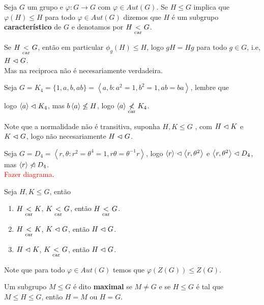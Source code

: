 \begin{definition}
  Seja $G$ um grupo e $\varphi:G\to G$ com $\varphi\in Aut(G)$. Se $H\leq G$ implica que $\varphi(H)\leq H$ para todo $\varphi\in Aut(G)$ dizemos que $H$ é um subgrupo \textbf{característico} de $G$ e denotamos por $H\underset{\text{car}}{<} G$. 
\end{definition}
\begin{note}
  Se $H\underset{\text{car}}{<} G$, então em particular $\phi_g(H)\leq H$, logo $gH=Hg$ para todo $g\in G$, i.e, $H\vartriangleleft G$.\\
  Mas na reciproca não é necesariamente verdadeira.
\end{note}
\begin{example}
  Seja $G=K_4=\{1,a,b,ab\}=\left\langle a,b:a^{2}=1,b^{2}=1,ab=ba \right\rangle$, lembre que
  \begin{center}
    
  \end{center}
  logo $\left\langle a \right\rangle\vartriangleleft K_4$, mas $b\left\langle a \right\rangle\cnot\leq H$, logo $\left\langle a \right\rangle \cnot\car K_4$.
\end{example}
Note que a normalidade não é transitiva, suponha $H,K\leq G$ , com $H\vartriangleleft K$ e $K\vartriangleleft G$, logo não necesariamente $H\vartriangleleft G$.
\begin{example}
  Seja $G=D_4=\left\langle r,\theta:r^{2}=\theta^{4}=1,r\theta=\theta^{-1}r \right\rangle$, logo $\left\langle r \right\rangle\vartriangleleft \left\langle r,\theta^{2} \right\rangle$ e $\left\langle r,\theta^{2} \right\rangle\vartriangleleft D_4$, mas $\left\langle r \right\rangle\cnot\normal D_4$.\\
  \textcolor{red}{Fazer diagrama}.
\end{example}
\begin{proposition}
  Seja $H,K\leq G$, então
  \begin{enumerate}
    \item $H\underset{\text{car}}{<} K$, $K\underset{\text{car}}{<} G$, então $H\underset{\text{car}}{<} G$.
    \item $H\underset{\text{car}}{<} K$, $K\vartriangleleft G$, então $H\vartriangleleft G$.
    \item $H\vartriangleleft K$, $K\underset{\text{car}}{<} G$, então $H\vartriangleleft G$.
  \end{enumerate}
\end{proposition}
\begin{example}
  Note que para todo $\varphi\in Aut(G)$ temos que $\varphi(Z(G))\leq Z(G)$.
\end{example}
\begin{definition}
  Um subgrupo $M\leq G$ é dito \textbf{maximal} se $M\neq G$ e se $H\leq G$ é tal que $M\leq H\leq G$, então $H=M$ ou $H=G$. 
\end{definition}
